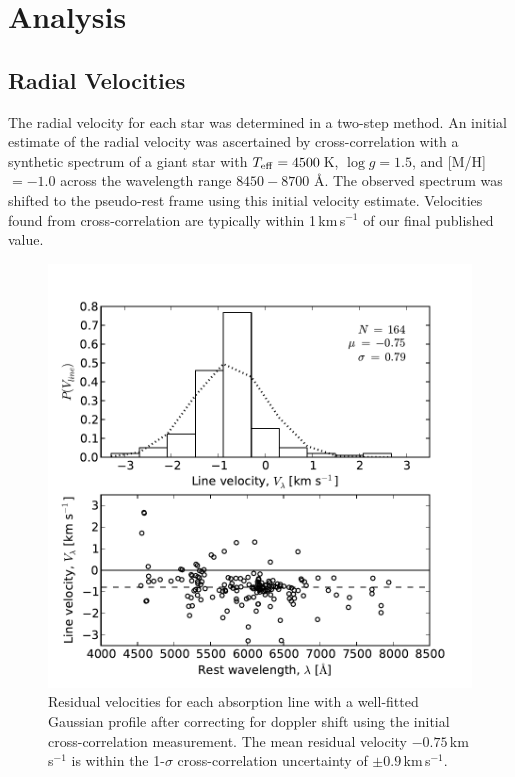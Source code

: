 \documentclass{emulateapj}
\begin{document}
\section{Analysis}
\label{sec:analysis}

\subsection{Radial Velocities}
\label{sec:radial-velocities}

The radial velocity for each star was determined in a two-step method. An initial estimate of the radial velocity was ascertained by cross-correlation with a synthetic spectrum of a giant star with $T_{\rm eff} = 4500$\,K, $\log{g} = 1.5$, and [M/H] $= -1.0$ across the wavelength range $8450 - 8700$ \AA{}. The observed spectrum was shifted to the pseudo-rest frame using this initial velocity estimate. Velocities found from cross-correlation are typically within 1\,km\,s$^{-1}$ of our final published value.

\begin{figure}[h!]
	\includegraphics[width=\columnwidth]{./figures/line-velocity.pdf}
	\caption{Residual velocities for each absorption line with a well-fitted Gaussian profile after correcting for doppler shift using the initial cross-correlation measurement. The mean residual velocity $-0.75$\,km\,s$^{-1}$ is within the 1-$\sigma$ cross-correlation uncertainty of $\pm0.9$\,km\,s$^{-1}$.}
	\label{fig:line-velocities}
\end{figure}
\end{document}
